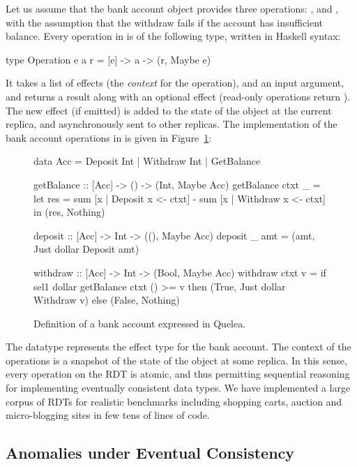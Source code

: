 Let us assume that the bank account object provides three operations:
,  and , with the assumption that the
withdraw fails if the account has insufficient balance. Every operation in
\quelea is of the following type, written in Haskell syntax:

\begin{codehaskell}
type Operation e a r = [e] -> a -> (r, Maybe e)
\end{codehaskell}

\noindent It takes a list of effects (the \emph{context} for the operation),
and an input argument, and returns a result along with an optional effect
(read-only operations return ). The new effect (if emitted) is
added to the state of the object at the current replica, and asynchronously
sent to other replicas. The implementation of the bank account operations in
\quelea is given in Figure~\ref{fig:ex}:

\begin{figure}[t]
\begin{codehaskell}
data Acc = Deposit Int | Withdraw Int | GetBalance

getBalance :: [Acc] -> () -> (Int, Maybe Acc)
getBalance ctxt _ =
  let res = sum [x | Deposit x <- ctxt]
						- sum [x | Withdraw x <- ctxt]
	in (res, Nothing)

deposit :: [Acc] -> Int -> ((), Maybe Acc)
deposit _ amt = (amt, Just dollar Deposit amt)

withdraw :: [Acc] -> Int -> (Bool, Maybe Acc)
withdraw ctxt v =
	if sel1 dollar getBalance ctxt () >= v
  then (True, Just dollar Withdraw v)
	else (False, Nothing)
\end{codehaskell}
\caption{Definition of a bank account expressed in Quelea.}
\label{fig:ex}
\end{figure}

The datatype  represents the effect type for the bank account. The
context of the operations is a snapshot of the state of the object at some
replica. In this sense, every operation on the RDT is atomic, and thus
permitting sequential reasoning for implementing eventually consistent data
types. We have implemented a large corpus of RDTs for realistic benchmarks
including shopping carts, auction and micro-blogging sites in few tens of lines
of code.

\subsection{Anomalies under Eventual Consistency}

